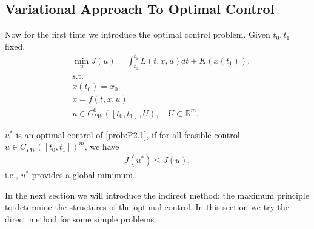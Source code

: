 \subsection{Variational Approach To Optimal Control}
Now for the first time we introduce the optimal control problem. Given $t_0, t_1$ fixed,  
\begin{equation}\tag{(P2.1)}\label{prob:P2.1}
\begin{aligned}
	& \min_{u } J(u)= \int_{t_0}^{t_1} L(t, x, u)dt + K(x(t_1)).\\
	& \text{s.t.}\\
	& x(t_0) = x_0\\
	& \dot{x} = f(t, x, u)\\
	& u \in C^0_{PW}([t_0, t_1], U), \quad U \subset \mathbb{R}^m.
\end{aligned}
\end{equation}

\begin{definition}
	$u^*$ is an optimal control of \eqref{prob:P2.1}, if for all feasible control $u  \in C_{PW}([t_0, t_1])^m$, we have
	\begin{align*}
		J(u^*) \le J(u),
	\end{align*}
	i.e., $u^*$ provides a global minimum. 
\end{definition}


In the next section we will introduce the indirect method: the maximum principle to determine the structures of the optimal control. In this section we try the direct method for some simple problems. 

